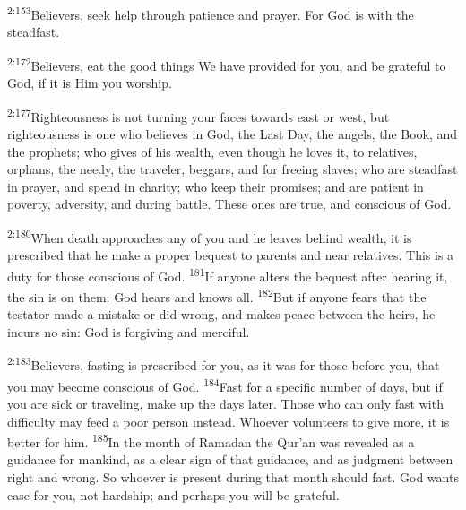 \documentclass[openany,12pt,english]{book}
\newenvironment{para}{\par\pretolerance=100\tolerance=200\setlength{\emergencystretch}{0.6em}\relax}{\par}
\begin{document}
\begin{para}
    \textsuperscript{2:153}\thinspace{}Believers, seek help through pa\-tience and pray\-er. For God is with the stead\-fast.
\end{para}

\begin{para}
    \textsuperscript{2:172}\thinspace{}Believers, eat the good things We have pro\-vid\-ed for you, and be grate\-ful to God, if it is Him you wor\-ship.
\end{para}

\begin{para}
    \textsuperscript{2:177}\thinspace{}Right\-eous\-ness is not turn\-ing your faces to\-wards east or west, but right\-eous\-ness is one who believes in God, the Last Day, the angels, the Book, and the prophets; who gives of his wealth, e\-ven though he loves it, to relatives, orphans, the needy, the trav\-el\-er, beggars, and for free\-ing slaves; who are stead\-fast in pray\-er, and spend in char\-i\-ty; who keep their promises; and are pa\-tient in pov\-er\-ty, ad\-ver\-si\-ty, and dur\-ing bat\-tle. These ones are true, and con\-scious of God.
\end{para}

\begin{para}
    \textsuperscript{2:180}\thinspace{}When death approaches any of you and he leaves be\-hind wealth, it is pre\-scribed that he make a prop\-er be\-quest to parents and near relatives. This is a du\-ty for those con\-scious of God.
    \textsuperscript{181}\thinspace{}If any\-one alters the be\-quest af\-ter hear\-ing it, the sin is on them: God hears and knows all.
    \textsuperscript{182}\thinspace{}But if any\-one fears that the tes\-ta\-tor made a mis\-take or did wrong, and makes peace be\-tween the heirs, he incurs no sin: God is for\-giv\-ing and mer\-ci\-ful.
\end{para}

\begin{para}
    \textsuperscript{2:183}\thinspace{}Believers, fasting is pre\-scribed for you, as it was for those be\-fore you, that you may be\-come con\-scious of God.
    \textsuperscript{184}\thinspace{}Fast for a spe\-cif\-ic num\-ber of days, but if you are sick or trav\-el\-ing, make up the days lat\-er. Those who can on\-ly fast with dif\-fi\-cul\-ty may feed a poor per\-son in\-stead. Who\-ev\-er volunteers to give more, it is bet\-ter for him.
    \textsuperscript{185}\thinspace{}In the month of Ramadan the Qur'an was revealed as a guid\-ance for man\-kind, as a clear sign of that guid\-ance, and as judg\-ment be\-tween right and wrong. So who\-ev\-er is pres\-ent dur\-ing that month should fast. God wants ease for you, not hard\-ship; and per\-haps you will be grate\-ful.
\end{para}
\end{document}
